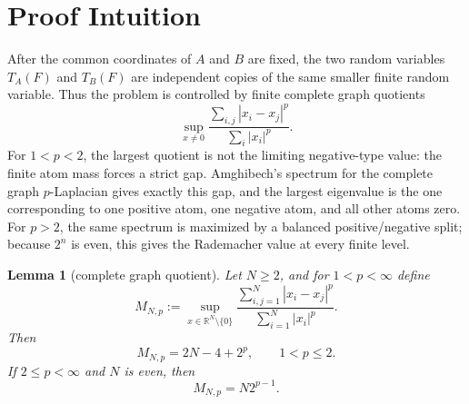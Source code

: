 \documentclass[11pt]{article}
\newtheorem{lemma}{Lemma}
\newcommand{\R}{\mathbb R}
\begin{document}
\section*{Proof Intuition}

After the common coordinates of \(A\) and \(B\) are fixed, the two random
variables \(T_A(F)\) and \(T_B(F)\) are independent copies of the same smaller
finite random variable.  Thus the problem is controlled by finite complete
graph quotients
\[
 \sup_{x\neq0}\frac{\sum_{i,j}|x_i-x_j|^p}{\sum_i |x_i|^p}.
\]
For \(1<p<2\), the largest quotient is not the limiting negative-type value:
the finite atom mass forces a strict gap.  Amghibech's spectrum for the
complete graph \(p\)-Laplacian gives exactly this gap, and the largest
eigenvalue is the one corresponding to one positive atom, one negative atom,
and all other atoms zero.  For \(p>2\), the same spectrum is maximized by a
balanced positive/negative split; because \(2^n\) is even, this gives the
Rademacher value at every finite level.

\begin{lemma}[complete graph quotient]\label{lem:complete}
Let \(N\geq2\), and for \(1<p<\infty\) define
\[
 M_{N,p}:=\sup_{x\in\R^N\setminus\{0\}}
 \frac{\sum_{i,j=1}^N |x_i-x_j|^p}{\sum_{i=1}^N |x_i|^p}.
\]
Then
\[
M_{N,p}=2N-4+2^p,\qquad 1<p\leq2.
\]
If \(2\leq p<\infty\) and \(N\) is even, then
\[
M_{N,p}=N2^{p-1}.
\]
\end{lemma}
\end{document}
